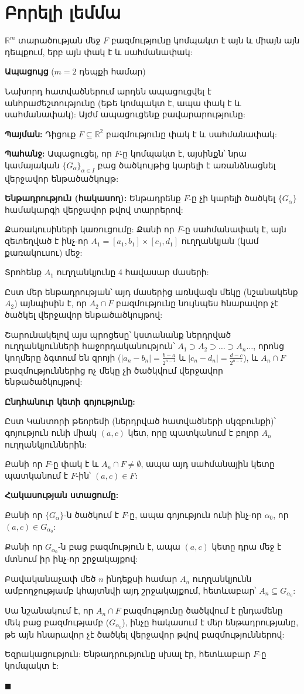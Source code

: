 \documentclass[12pt, a4paper]{article}
\begin{document}
\section{Բորելի լեմմա}

$\mathbb{R}^m$ տարածության մեջ $F$ բազմությունը կոմպակտ է այն և միայն այն դեպքում, երբ այն փակ է և սահմանափակ:

\textbf{Ապացույց} ($m=2$ դեպքի համար)

Նախորդ հատվածներում արդեն ապացուցվել է անհրաժեշտությունը (եթե կոմպակտ է, ապա փակ է և սահմանափակ): Այժմ ապացուցենք բավարարությունը:

\textbf{Պայման:} Դիցուք $F \subseteq \mathbb{R}^2$ բազմությունը փակ է և սահմանափակ:

\textbf{Պահանջ:} Ապացուցել, որ $F$-ը կոմպակտ է, այսինքն՝ նրա կամայական $\{G_\alpha\}_{\alpha \in I}$ բաց ծածկույթից կարելի է առանձնացնել վերջավոր ենթածածկույթ:

\textbf{Ենթադրություն (հակասող):} Ենթադրենք $F$-ը չի կարելի ծածկել $\{G_\alpha\}$ համակարգի վերջավոր թվով տարրերով:

Քառակուսիների կառուցումը: Քանի որ $F$-ը սահմանափակ է, այն զետեղված է ինչ-որ $A_1 = [a_1, b_1] \times [c_1, d_1]$ ուղղանկյան (կամ քառակուսու) մեջ:

Տրոհենք $A_1$ ուղղանկյունը 4 հավասար մասերի:

Ըստ մեր ենթադրության՝ այդ մասերից առնվազն մեկը (նշանակենք $A_2$) այնպիսին է, որ $A_2 \cap F$ բազմությունը նույնպես հնարավոր չէ ծածկել վերջավոր ենթածածկույթով:

Շարունակելով այս պրոցեսը՝ կստանանք ներդրված ուղղանկյունների հաջորդականություն՝ $A_1 \supset A_2 \supset \dots \supset A_n \dots$, որոնց կողմերը ձգտում են զրոյի ($|a_n - b_n| = \frac{b-a}{2^{n-1}}$ և $|c_n - d_n| = \frac{d-c}{2^{n-1}}$), և $A_n \cap F$ բազմություններից ոչ մեկը չի ծածկվում վերջավոր ենթածածկույթով:

\textbf{Ընդհանուր կետի գոյությունը:}

Ըստ Կանտորի թեորեմի (ներդրված հատվածների սկզբունքի)՝ գոյություն ունի միակ $(a, c)$ կետ, որը պատկանում է բոլոր $A_n$ ուղղանկյուններին:

Քանի որ $F$-ը փակ է և $A_n \cap F \neq \emptyset$, ապա այդ սահմանային կետը պատկանում է $F$-ին՝ $(a, c) \in F$։

\textbf{Հակասության ստացումը:}

Քանի որ $\{G_\alpha\}$-ն ծածկում է $F$-ը, ապա գոյություն ունի ինչ-որ $\alpha_0$, որ $(a, c) \in G_{\alpha_0}$:

Քանի որ $G_{\alpha_0}$-ն բաց բազմություն է, ապա $(a, c)$ կետը դրա մեջ է մտնում իր ինչ-որ շրջակայքով:

Բավականաչափ մեծ $n$ ինդեքսի համար $A_n$ ուղղանկյունն ամբողջությամբ կհայտնվի այդ շրջակայքում, հետևաբար՝ $A_n \subseteq G_{\alpha_0}$:

Սա նշանակում է, որ $A_n \cap F$ բազմությունը ծածկվում է ընդամենը մեկ բաց բազմությամբ ($G_{\alpha_0}$), ինչը հակասում է մեր ենթադրությանը, թե այն հնարավոր չէ ծածկել վերջավոր թվով բազմություններով:

Եզրակացություն: Ենթադրությունը սխալ էր, հետևաբար $F$-ը կոմպակտ է:

$\blacksquare$
\end{document}
